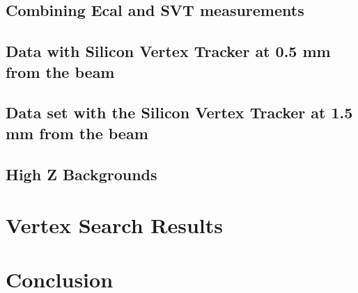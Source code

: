 \documentclass[12pt]{report}
\begin{document}
\section{Combining Ecal and SVT measurements}
\section{Data with Silicon Vertex Tracker at 0.5 mm from the beam}
\section{Data set with the Silicon Vertex Tracker at 1.5 mm from the beam}
\section{High Z Backgrounds}

\chapter{Vertex Search Results}
\chapter{Conclusion}
\end{document}
